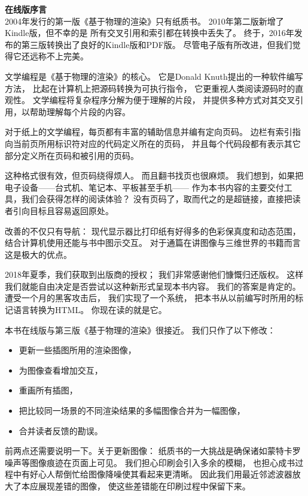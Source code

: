 {\Huge\bfseries 在线版序言}\vspace{30pt}\\

2004年发行的第一版《基于物理的渲染》只有纸质书。
2010年第二版新增了Kindle版，但不幸的是
所有交叉引用和索引都在转换中丢失了。
终于，2016年发布的第三版转换出了良好的Kindle版和PDF版。
尽管电子版有所改进，但我们觉得它还远称不上完美。

文学编程是《基于物理的渲染》的核心。
它是Donald Knuth提出的一种软件编写方法，
比起在计算机上把源码转换为可执行指令，
它更重视人类阅读源码时的直观性。
文学编程将复杂程序分解为便于理解的片段，
并提供多种方式对其交叉引用，以帮助理解每个片段的内容。

对于纸上的文学编程，每页都有丰富的辅助信息并编有定向页码。
边栏有索引指向当前页所用标识符对应的代码定义所在的页码，
并且每个代码段都有表示其它部分定义所在页码和被引用的页码。

这种格式很有效，但页码绕得烦人。
而且翻书找页也很麻烦。
我们想到，如果把电子设备——台式机、笔记本、平板甚至手机——
作为本书内容的主要交付工具，我们会获得怎样的阅读体验？
没有页码了，取而代之的是超链接，直接把读者引向目标且容易返回原处。

改善的不仅只有导航：
现代显示器比打印纸有好得多的色彩保真度和动态范围，
结合计算机使用还能与书中图示交互。
对于通篇在讲图像与三维世界的书籍而言这是极大的优点。

2018年夏季，我们获取到出版商的授权；
我们非常感谢他们慷慨归还版权。
这样我们就能自由决定是否尝试以这种新形式呈现本书内容。
我们的答案是肯定的。
遭受一个月的黑客攻击后，
我们实现了一个系统，
把本书从以前编写时所用的标记语言转换为HTML。
你现在读的就是它。

本书在线版与第三版《基于物理的渲染》很接近。
我们只作了以下修改：
\begin{itemize}
    \item 更新一些插图所用的渲染图像，
    \item 为图像查看增加交互，
    \item 重画所有插图，
    \item 把比较同一场景的不同渲染结果的多幅图像合并为一幅图像，
    \item 合并读者反馈的勘误。
\end{itemize}

前两点还需要说明一下。关于更新图像：
纸质书的一大挑战是确保诸如蒙特卡罗噪声等图像痕迹在页面上可见。
我们担心印刷会引入多余的模糊，
也担心成书过程中有好心人帮倒忙给图像降噪使其看起来更清晰。
因此我们用最近邻滤波器放大了本应展现差错的图像，
使这些差错能在印刷过程中保留下来。

